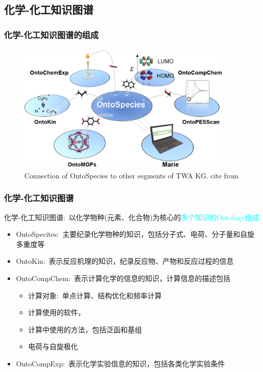 \subsection{化学-化工知识图谱}
\frame
{
	\frametitle{化学-化工知识图谱的组成}
\begin{figure}[h!]
\centering
\vskip -8pt
\includegraphics[height=2.45in,width=4.05in,viewport=0 0 1170 700,clip]{Figures/Connection-of-OntoSpecies-to-segments-of-KG.png}
\caption{\tiny\textrm{Connection of OntoSpecies to other segments of TWA KG. cite from\cite{ACR56-128_2023}}}%
\label{Fig:OntoSpecies-to-segments-TWA}
\end{figure}
}

\frame
{
	\frametitle{化学-化工知识图谱}
	化学-化工知识图谱:~以化学物种(元素、化合物)为核心的\textcolor{cyan}{多个知识的\textrm{Ontology}组成}
	\begin{itemize}
		\item \textrm{OntoSpecites}:~主要纪录化学物种的知识，包括分子式、电荷、分子量和自旋多重度等
		\item \textrm{OntoKin}:~表示反应机理的知识，纪录反应物、产物和反应过程的信息
		\item \textrm{OntoCompChem}:~表示计算化学的信息的知识，计算信息的描述包括
			\begin{itemize}
				\item 计算对象:~单点计算、结构优化和频率计算
				\item 计算使用的软件，{\fontsize{7.2pt}{5.2pt}}
				\item 计算中使用的方法，包括泛函和基组{\fontsize{7.2pt}{5.2pt}}
				\item 电荷与自旋极化
			\end{itemize}
		\item \textrm{OntoCompExp}:~表示化学实验信息的知识，包括各类化学实验条件
	\end{itemize}
}

